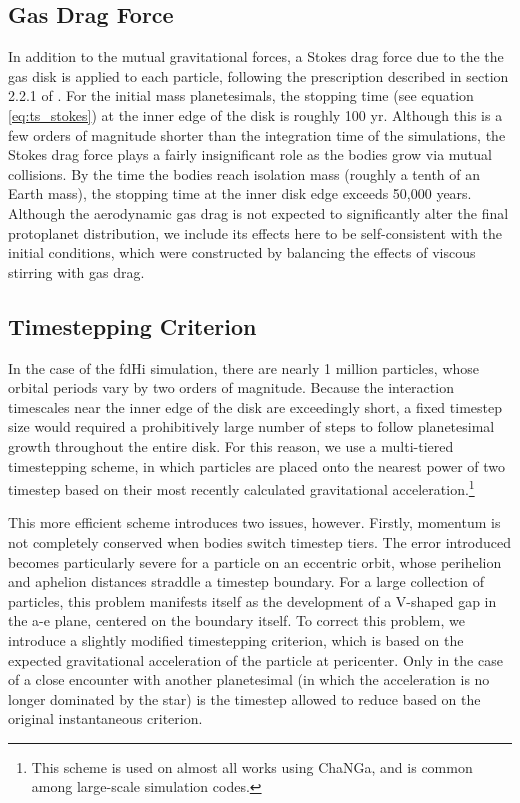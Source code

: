 \documentclass[twocolumn,linenumbers]{aastex63}
\begin{document}
\subsection{Gas Drag Force}

In addition to the mutual gravitational forces, a Stokes drag force due to the the gas disk is applied to each particle, following the prescription described in section 2.2.1 of \citet{morishima10}. For the initial mass planetesimals, the stopping time (see equation \ref{eq:ts_stokes}) at the inner edge of the disk is roughly 100 yr. Although this is a few orders of magnitude shorter than the integration time of the simulations, the Stokes drag force plays a fairly insignificant role as the bodies grow via mutual collisions. By the time the bodies reach isolation mass (roughly a tenth of an Earth mass), the stopping time at the inner disk edge exceeds 50,000 years. Although the aerodynamic gas drag is not expected to significantly alter the final protoplanet distribution, we include its effects here to be self-consistent with the initial conditions, which were constructed by balancing the effects of viscous stirring with gas drag.

\subsection{Timestepping Criterion}

In the case of the fdHi simulation, there are nearly 1 million
particles, whose orbital periods vary by two orders of magnitude. Because the
interaction timescales near the inner edge of the
disk are exceedingly short, a fixed timestep size would required a prohibitively large
number of steps to follow planetesimal growth throughout the entire
disk. For this reason, we use a multi-tiered timestepping scheme, in
which particles are placed onto the nearest power of two timestep
based on their most recently calculated gravitational
acceleration.\footnote{This scheme is used on almost all works using ChaNGa,
and is common among large-scale simulation codes.}

This more efficient scheme introduces two issues, however. Firstly,
momentum is not completely conserved when bodies switch timestep tiers. The
error introduced becomes particularly severe for a particle on an
eccentric orbit, whose perihelion and aphelion distances
straddle a timestep boundary. For a large collection of particles,
this problem manifests itself as the development of a V-shaped gap in the a-e plane, centered on the boundary itself. To correct this problem, we introduce a slightly modified timestepping criterion, which is based on the expected gravitational acceleration of the particle at pericenter. Only in the case of a close encounter with another planetesimal (in which the acceleration is no longer dominated by the star) is the timestep allowed to reduce based on the original instantaneous criterion.
\end{document}
